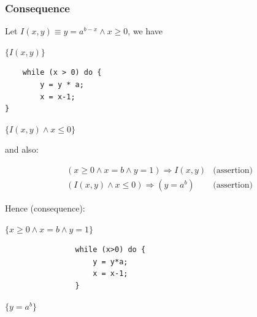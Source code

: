 \documentclass[12pt, a4paper]{book}
\begin{document}
    \subsubsection{Consequence}

    Let $I(x,y) \equiv y = {a}^{b-x} \land x \ge 0$, we have

    \begin{minipage}{\linewidth}
        \begin{minipage}{0.3\linewidth}
            $\{ I(x,y) \}$
        \end{minipage}
        \begin{minipage}{0.3\linewidth}
\begin{lstlisting}
    while (x > 0) do {
        y = y * a;
        x = x-1;
}
\end{lstlisting}
        \end{minipage}
        \begin{minipage}{0.3\linewidth}
            $\{ I(x,y) \land x \le 0 \}$
        \end{minipage}
    \end{minipage}

    and also:

    \begin{eqnarray*}
        (x \ge 0 \land x = b \land y = 1) \Rightarrow I(x,y) & \textrm{(assertion)} \\
        (I(x,y) \land x \le 0) \Rightarrow (y = {a}^{b}) & \textrm{(assertion)}
    \end{eqnarray*}

    Hence (consequence):

    \begin{minipage}{\linewidth}
        \begin{minipage}{0.3\linewidth}
            $\{ x \ge 0 \land x = b \land y = 1 \}$
        \end{minipage}
        \begin{minipage}{0.3\linewidth}
            \begin{lstlisting}
                while (x>0) do {
                    y = y*a;
                    x = x-1;
                }
            \end{lstlisting}
        \end{minipage}
        \begin{minipage}{0.3\linewidth}
            $\{ y = {a}^{b} \}$
        \end{minipage}
    \end{minipage}
\end{document}
